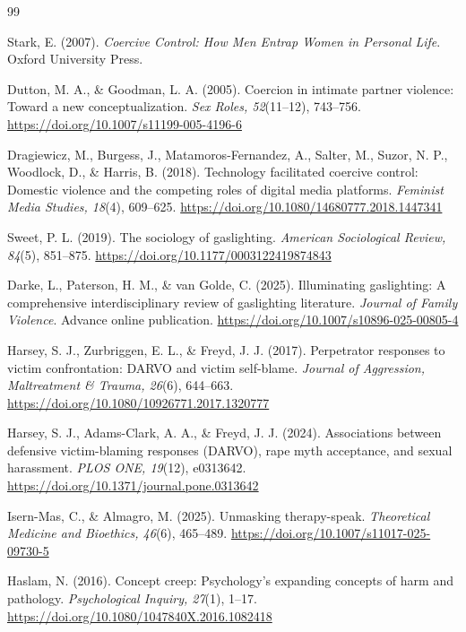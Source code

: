\documentclass[11pt, letterpaper]{article}
\begin{document}
\begin{thebibliography}{99}

Stark, E. (2007).
\textit{Coercive Control: How Men Entrap Women in Personal Life}.
Oxford University Press.

Dutton, M. A., \& Goodman, L. A. (2005).
Coercion in intimate partner violence: Toward a new conceptualization.
\textit{Sex Roles, 52}(11--12), 743--756.
\url{https://doi.org/10.1007/s11199-005-4196-6}

Dragiewicz, M., Burgess, J., Matamoros-Fernandez, A., Salter, M., Suzor, N. P., Woodlock, D., \& Harris, B. (2018).
Technology facilitated coercive control: Domestic violence and the competing roles of digital media platforms.
\textit{Feminist Media Studies, 18}(4), 609--625.
\url{https://doi.org/10.1080/14680777.2018.1447341}

Sweet, P. L. (2019).
The sociology of gaslighting.
\textit{American Sociological Review, 84}(5), 851--875.
\url{https://doi.org/10.1177/0003122419874843}

Darke, L., Paterson, H. M., \& van Golde, C. (2025).
Illuminating gaslighting: A comprehensive interdisciplinary review of gaslighting literature.
\textit{Journal of Family Violence}. Advance online publication.
\url{https://doi.org/10.1007/s10896-025-00805-4}

Harsey, S. J., Zurbriggen, E. L., \& Freyd, J. J. (2017).
Perpetrator responses to victim confrontation: DARVO and victim self-blame.
\textit{Journal of Aggression, Maltreatment \& Trauma, 26}(6), 644--663.
\url{https://doi.org/10.1080/10926771.2017.1320777}

Harsey, S. J., Adams-Clark, A. A., \& Freyd, J. J. (2024).
Associations between defensive victim-blaming responses (DARVO), rape myth acceptance, and sexual harassment.
\textit{PLOS ONE, 19}(12), e0313642.
\url{https://doi.org/10.1371/journal.pone.0313642}

Isern-Mas, C., \& Almagro, M. (2025).
Unmasking therapy-speak.
\textit{Theoretical Medicine and Bioethics, 46}(6), 465--489.
\url{https://doi.org/10.1007/s11017-025-09730-5}

Haslam, N. (2016).
Concept creep: Psychology's expanding concepts of harm and pathology.
\textit{Psychological Inquiry, 27}(1), 1--17.
\url{https://doi.org/10.1080/1047840X.2016.1082418}


\end{thebibliography}
\end{document}

